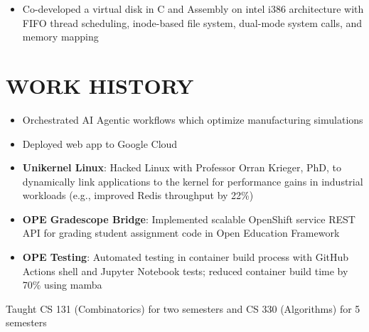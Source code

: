 \documentclass[10pt]{article} 
\begin{document}
\begin{FlushLeft}
  \begin{itemize}
  \item Co-developed a virtual disk in C and Assembly on intel i386
    architecture with FIFO thread scheduling, inode-based file system,
    dual-mode system calls, and memory mapping
  \end{itemize}
  
  \section{WORK HISTORY}
  \begin{itemize}
  \item Orchestrated AI Agentic workflows which optimize manufacturing simulations
  \item Deployed web app to Google Cloud
\end{itemize}
\begin{itemize}
\item \textbf{Unikernel Linux}: Hacked Linux with Professor Orran
  Krieger, PhD, to dynamically link applications to the kernel for
  performance gains in industrial workloads (e.g., improved Redis
  throughput by 22\%)
\item \textbf{OPE Gradescope Bridge}: Implemented scalable OpenShift
  service REST API for grading student assignment code in Open
  Education Framework
\item \textbf{OPE Testing}: Automated testing in container build
  process with GitHub Actions shell and Jupyter Notebook tests;
  reduced container build time by 70\% using mamba
\end{itemize}

  \begin{itemize}{
    \item Taught CS 131 (Combinatorics) for two semesters and CS 330
      (Algorithms) for 5 semesters }
  \end{itemize}

  

\end{FlushLeft}
\end{document}
